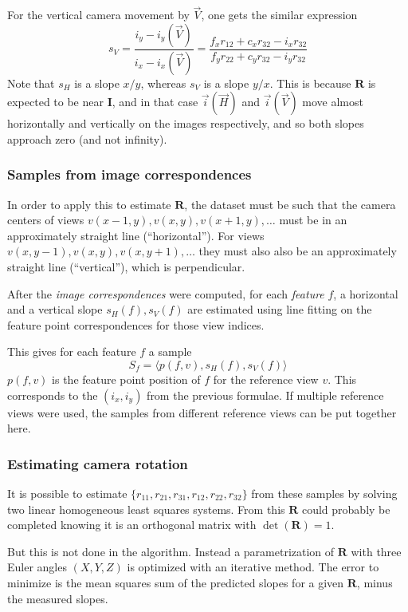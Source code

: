 \documentclass[11pt]{scrreprt}
\newcommand{\matr}[1]{\mathbf{#1}}
\begin{document}
For the vertical camera movement by $\vec{V}$, one gets the similar expression
\begin{equation}
s_V = \frac{i_y - i_y(\vec{V})}{i_x - i_x(\vec{V})} = \frac{f_x r_{12} + c_x r_{32} - i_x r_{32}}{f_y r_{22} + c_y r_{32} - i_y r_{32}}
\end{equation}
Note that $s_H$ is a slope $x/y$, whereas $s_V$ is a slope $y/x$. This is because $\matr{R}$ is expected to be near $\matr{I}$, and in that case $\vec{i}(\vec{H})$ and $\vec{i}(\vec{V})$ move almost horizontally and vertically on the images respectively, and so both slopes approach zero (and not infinity).


\subsubsection{Samples from image correspondences}
In order to apply this to estimate $\matr{R}$, the dataset must be such that the camera centers of views $v(x-1,y), v(x,y), v(x+1,y), \dots$ must be in an approximately straight line (``horizontal''). For views $v(x,y-1), v(x,y), v(x,y+1), \dots$ they must also also be an approximately straight line (``vertical''), which is perpendicular.

After the \emph{image correspondences} were computed, for each \emph{feature} $f$, a horizontal and a vertical slope $s_H(f), s_V(f)$ are estimated using line fitting on the feature point correspondences for those view indices.

This gives for each feature $f$ a sample
\begin{equation}
S_f = \langle p(f,v), s_H(f), s_V(f) \rangle
\end{equation}
$p(f,v)$ is the feature point position of $f$ for the reference view $v$. This corresponds to the $(i_x, i_y)$ from the previous formulae. If multiple reference views were used, the samples from different reference views can be put together here.


\subsubsection{Estimating camera rotation}
It is possible to estimate $\{r_{11}, r_{21}, r_{31}, r_{12}, r_{22}, r_{32}\}$ from these samples by solving two linear homogeneous least squares systems. From this $\matr{R}$ could probably be completed knowing it is an orthogonal matrix with $\det(\matr{R}) = 1$.

But this is not done in the algorithm. Instead a parametrization of $\matr{R}$ with three Euler angles $(X,Y,Z)$ is optimized with an iterative method. The error to minimize is the mean squares sum of the predicted slopes for a given $\matr{R}$, minus the measured slopes.
\end{document}
